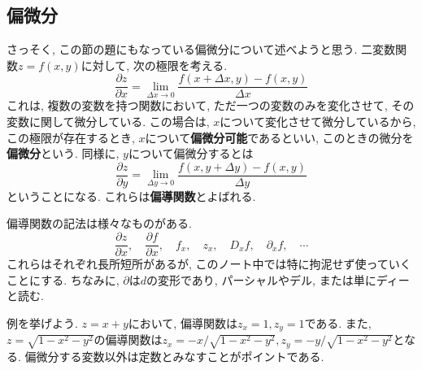\documentclass[a4j,dvipdfmx]{jsarticle}
\numberwithin{equation}{section}
\begin{document}
        \subsection{偏微分}
            さっそく, この節の題にもなっている偏微分について述べようと思う. 二変数関数$z=f(x,y)$に対して, 次の極限を考える.
            \begin{equation}
                \frac{\partial z}{\partial x} =\lim_{\Delta x\to 0}\frac{f(x+\Delta x,y)-f(x,y)}{\Delta x} \label{eq:偏微分:xについて偏微分} 
            \end{equation}
            これは, 複数の変数を持つ関数において, ただ一つの変数のみを変化させて, その変数に関して微分している. この場合は, $x$について変化させて微分しているから, 
            この極限が存在するとき, $x$について\textbf{偏微分可能}であるといい, このときの微分を\textbf{偏微分}という.
            同様に, $y$について偏微分するとは
            \begin{equation}
                \frac{\partial z}{\partial y} =\lim_{\Delta y\to 0}\frac{f(x,y+\Delta y)-f(x,y)}{\Delta y} \label{eq:偏微分:yについて偏微分} 
            \end{equation}
            ということになる. これらは\textbf{偏導関数}とよばれる.

            偏導関数の記法は様々なものがある.
            \begin{equation}
                \frac{\partial z}{\partial x},\quad \frac{\partial f}{\partial x},\quad f_x,\quad z_x,\quad D_x f,\quad \partial_x f,\quad\cdots
            \end{equation}
            これらはそれぞれ長所短所があるが, このノート中では特に拘泥せず使っていくことにする. ちなみに, $\partial$は$d$の変形であり, パーシャルやデル, または単にディーと読む.

            例を挙げよう. $z=x+y$において, 偏導関数は$z_x=1,z_y=1$である. また, $z=\sqrt{1-x^2-y^2}$の偏導関数は$z_x=-x/\sqrt{1-x^2-y^2},z_y=-y/\sqrt{1-x^2-y^2}$となる.
            偏微分する変数以外は定数とみなすことがポイントである.
            
\end{document}
